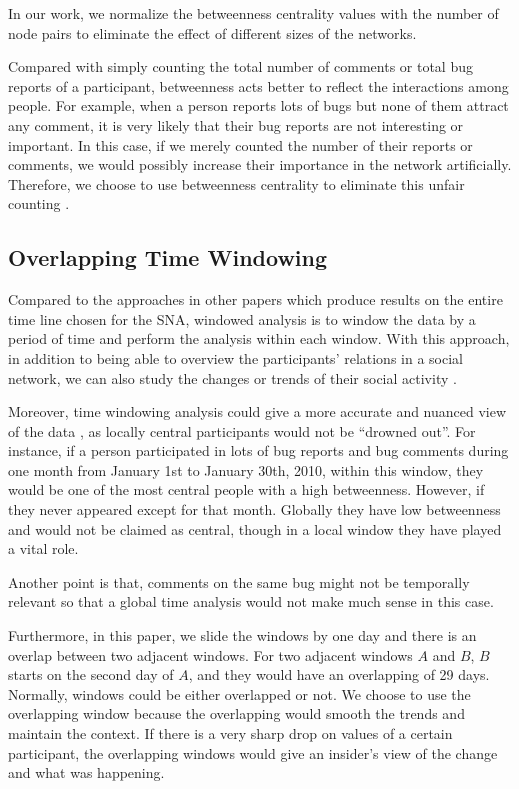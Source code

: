 \documentclass[10pt, conference, compsocconf]{IEEEtran}
\begin{document}
In our work, we normalize the betweenness centrality values with the number of node pairs to eliminate the effect of different sizes of the networks.

Compared with simply counting the total number of comments or total bug reports of a participant, betweenness acts better to reflect the interactions among people. For example, when a person reports lots of bugs but none of them attract any comment, it is very likely that their bug reports are not interesting or important. In this case, if we merely counted the number of their reports or comments, we would possibly increase their importance in the network artificially. Therefore, we choose to use betweenness centrality to eliminate this unfair counting \cite{ICSEsocio:la}.

\subsection{Overlapping Time Windowing}

Compared to the approaches in other papers which produce results on the entire time line chosen for the SNA, windowed analysis is to window the data by a period of time and perform the analysis within each window. With this approach, in addition to being able to overview the participants' relations in a social network, we can also study the changes or trends of their social activity \cite{ICSMwindowed:hindle}. 

Moreover, time windowing analysis could give a more accurate and nuanced view of the data \cite{ICSEsocio:meneely} \cite{ICSMwindowed:hindle}, as locally central participants would not be \textquotedblleft drowned out\textquotedblright. For instance, if a person participated in lots of bug reports and bug comments during one month from January 1st to January 30th, 2010, within this window, they would be one of the most central people with a high betweenness. However, if they never appeared except for that month. Globally they have low betweenness and would not be claimed as central, though in a local window they have played a vital role. 

Another point is that, comments on the same bug might not be temporally relevant \cite{Springer:kidane} \cite{Procedia:ibaa} so that a global time analysis would not make much sense in this case.

Furthermore, in this paper, we slide the windows by one day and there is an overlap between two adjacent windows. For two adjacent windows $A$ and $B$, $B$ starts on the second day of $A$, and they would have an overlapping of 29 days. Normally, windows could be either overlapped or not. We choose to use the overlapping window because the overlapping would smooth the trends and maintain the context. If there is a very sharp drop on values of a certain participant, the overlapping windows would give an insider's view of the change and what was happening.
\end{document}
